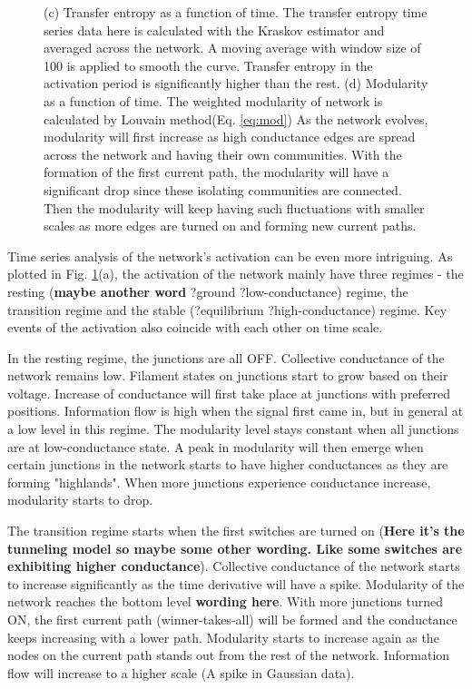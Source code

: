 \documentclass[%
 reprint,
 amsmath,amssymb,
 aps,
]{revtex4-2}
\begin{document}
\begin{figure}
{			\newline (c) Transfer entropy as a function of time. The transfer entropy time series data here is calculated with the Kraskov estimator and averaged across the network. A moving average with window size of 100 is applied to smooth the curve. Transfer entropy in the activation period is significantly higher than the rest.
			\newline (d) Modularity as a function of time. The weighted modularity of network is calculated by Louvain method(Eq. \ref{eq:mod}) As the network evolves, modularity will first increase as high conductance edges are spread across the network and having their own communities. With the formation of the first current path, the modularity will have a significant drop since these isolating communities are connected. Then the modularity will keep having such fluctuations with smaller scales as more edges are turned on and forming new current paths.}
	\label{fig:time_series}
\end{figure}

Time series analysis of the network's activation can be even more intriguing. As plotted in Fig. \ref{fig:time_series}(a), the activation of the network mainly have three regimes - the resting (\textbf{maybe another word} ?ground ?low-conductance) regime, the transition regime and the stable (?equilibrium ?high-conductance) regime. Key events of the activation also coincide with each other on time scale. 


In the resting regime, the junctions are all OFF. Collective conductance of the network remains low. Filament states on junctions start to grow based on their voltage. Increase of conductance will first take place at junctions with preferred positions. Information flow is high when the signal first came in, but in general at a low level in this regime. The modularity level stays constant when all junctions are at low-conductance state. A peak in modularity will then emerge when certain junctions in the network starts to have higher conductances as they are forming "highlands". When more junctions experience conductance increase, modularity starts to drop.

The transition regime starts when the first switches are turned on (\textbf{Here it's the tunneling model so maybe some other wording. Like some switches are exhibiting higher conductance}). Collective conductance of the network starts to increase significantly as the time derivative will have a spike. Modularity of the network reaches the bottom level \textbf{wording here}. With more junctions turned ON, the first current path (winner-takes-all) will be formed and the conductance keeps increasing with a lower path. Modularity starts to increase again as the nodes on the current path stands out from the rest of the network. Information flow will increase to a higher scale (A spike in Gaussian data). 
\end{document}
